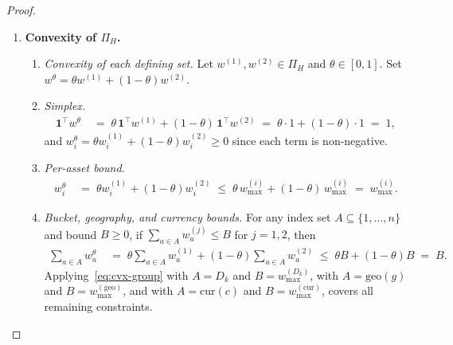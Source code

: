 \documentclass[12pt,openany]{book}
\newcommand{\R}{\mathbb{R}}
\newcommand{\bfw}{\mathbf{w}}
\newcommand{\calD}{\mathcal{D}}
\numberwithin{equation}{chapter}
\theoremstyle{plain}
\theoremstyle{definition}
\theoremstyle{remark}
\def\calD{D}%
\def\mathcal#1{#1}%
\def\bfw{w}%
\begin{document}
\begin{proof}
\begin{enumerate}
\begin{enumerate}
    \item \textit{Compactness.}
          By the Heine--Borel theorem (applied in $\R^n$), a subset of
          $\R^n$ that is closed and bounded is compact.  $\Pi_H$ is
          both, so $\Pi_H$ is compact.
  \end{enumerate}

\item \textbf{Convexity of $\Pi_H$.}

  \begin{enumerate}
    \item \textit{Convexity of each defining set.}
          Let $\bfw^{(1)}, \bfw^{(2)} \in \Pi_H$ and
          $\theta \in [0,1]$.  Set
          $\bfw^{\theta} = \theta\bfw^{(1)} + (1-\theta)\bfw^{(2)}$.

    \item \textit{Simplex.}
          \begin{align}
            \mathbf{1}^{\top}\bfw^{\theta}
            &\;=\;
            \theta\,\mathbf{1}^{\top}\bfw^{(1)}
            + (1-\theta)\,\mathbf{1}^{\top}\bfw^{(2)}
            \;=\;
            \theta \cdot 1 + (1-\theta)\cdot 1
            \;=\; 1,
            \label{eq:cvx-simplex}
          \end{align}
          and $w_i^{\theta} = \theta w_i^{(1)} + (1-\theta)w_i^{(2)}
          \geq 0$ since each term is non-negative.

    \item \textit{Per-asset bound.}
          \begin{align}
            w_i^{\theta}
            &\;=\;
            \theta w_i^{(1)} + (1-\theta)w_i^{(2)}
            \;\leq\;
            \theta\, w_{\max}^{(i)} + (1-\theta)\,w_{\max}^{(i)}
            \;=\; w_{\max}^{(i)}.
            \label{eq:cvx-asset}
          \end{align}

    \item \textit{Bucket, geography, and currency bounds.}
          For any index set $\mathcal{A} \subseteq \{1,\ldots,n\}$
          and bound $B \geq 0$, if
          $\sum_{a\in\mathcal{A}} w_a^{(j)} \leq B$ for $j=1,2$, then
          \begin{align}
            \sum_{a \in \mathcal{A}} w_a^{\theta}
            &\;=\;
            \theta \sum_{a\in\mathcal{A}} w_a^{(1)}
            + (1-\theta)\sum_{a\in\mathcal{A}} w_a^{(2)}
            \;\leq\;
            \theta B + (1-\theta)B
            \;=\; B.
            \label{eq:cvx-group}
          \end{align}
          Applying~\eqref{eq:cvx-group} with $\mathcal{A} = \mathcal{D}_k$
          and $B = w_{\max}^{(\calD_k)}$, with
          $\mathcal{A} = \mathrm{geo}(g)$ and
          $B = w_{\max}^{(\mathrm{geo})}$, and with
          $\mathcal{A} = \mathrm{cur}(c)$ and
          $B = w_{\max}^{(\mathrm{cur})}$, covers all remaining
          constraints.


\end{enumerate}
\end{enumerate}
\end{proof}
\end{document}
